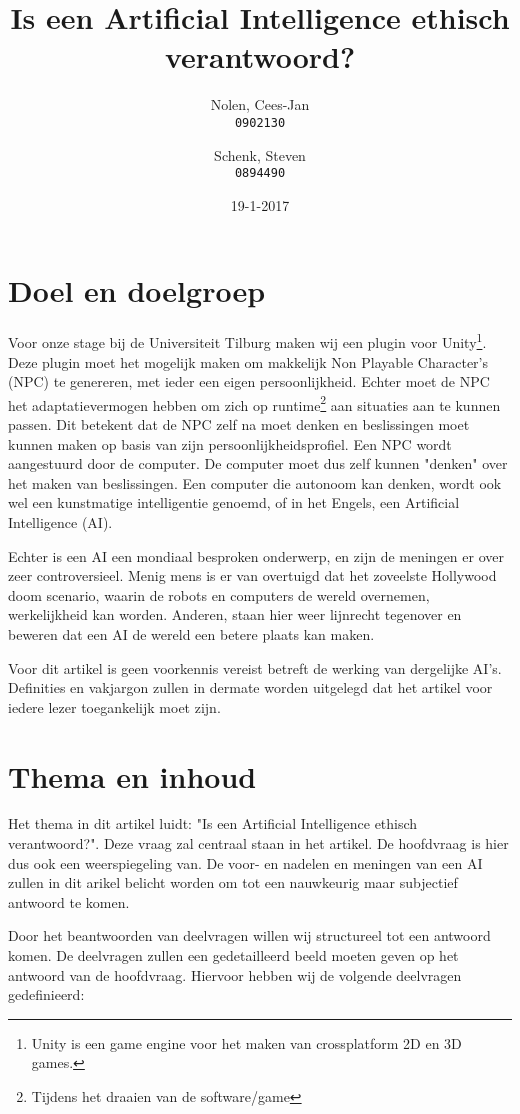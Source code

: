 \documentclass{article}
\title{Is een Artificial Intelligence ethisch verantwoord?}
\date{19-1-2017}
\author{Nolen, Cees-Jan\\
  \texttt{0902130}
  \and
  Schenk, Steven\\
  \texttt{0894490}}
\begin{document}
\maketitle
\newpage
{}
\tableofcontents

\newpage
\section{Doel en doelgroep}
Voor onze stage bij de Universiteit Tilburg maken wij een plugin voor Unity\footnote{Unity is een game engine voor het maken van crossplatform 2D en 3D games.}. 
Deze plugin moet het mogelijk maken om
makkelijk Non Playable Character's (NPC) te genereren, met ieder een eigen persoonlijkheid. Echter moet de NPC het adaptatievermogen hebben om zich
op runtime\footnote{Tijdens het draaien van de software/game}  aan situaties aan te kunnen passen. Dit betekent dat de NPC zelf na moet denken en beslissingen moet 
kunnen maken op basis van zijn persoonlijkheidsprofiel. Een NPC wordt aangestuurd door de computer. De computer moet dus zelf kunnen "denken"
over het maken van beslissingen. Een computer die autonoom kan denken, wordt ook wel een kunstmatige intelligentie genoemd, of in het Engels,
een Artificial Intelligence (AI).

Echter is een AI een mondiaal besproken onderwerp, en zijn de meningen er over zeer controversieel. Menig mens is er van overtuigd dat het
zoveelste Hollywood doom scenario, waarin de robots en computers de wereld overnemen, werkelijkheid kan worden. Anderen, staan hier weer
lijnrecht tegenover en beweren dat een AI de wereld een betere plaats kan maken.  

Voor dit artikel is geen voorkennis vereist betreft de werking van dergelijke AI's. Definities en vakjargon zullen in dermate worden uitgelegd
dat het artikel voor iedere lezer toegankelijk moet zijn. 


\newpage
\section{Thema en inhoud}
Het thema in dit artikel luidt: "Is een Artificial Intelligence ethisch verantwoord?". Deze vraag zal centraal staan in het artikel. 
De hoofdvraag is hier dus ook een weerspiegeling van. De voor- en nadelen en meningen van een AI zullen in dit arikel belicht worden
om tot een nauwkeurig maar subjectief antwoord te komen. 

Door het beantwoorden van deelvragen willen wij structureel tot een antwoord komen. De deelvragen zullen een gedetailleerd beeld moeten
geven op het antwoord van de hoofdvraag. Hiervoor hebben wij de volgende deelvragen
gedefinieerd:
\end{document}
